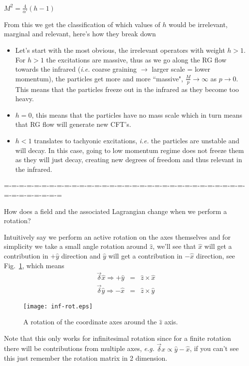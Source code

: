 \documentclass[aps,preprint,preprintnumbers,nofootinbib,showpacs,prd]{revtex4-1}
\newcommand{\ie}{{\it i.e.} }
\newcommand{\eg}{{\it e.g.} }
\newcommand{\bit}{\begin{itemize}}
\newcommand{\eit}{\end{itemize}}
\newcommand{\nbea}{\begin{eqnarray*}}
\newcommand{\neea}{\end{eqnarray*}}
\begin{document}
$M^2 = \frac{4}{\alpha'} (h - 1)$

From this we get the classification of which values of $h$ would be irrelevant, marginal and relevant, here's how they break down
\bit
\item Let's start with the most obvious, the irrelevant operators with weight $h > 1$. For $h > 1$ the excitations are massive, thus as we go along the RG flow towards the infrared (\ie coarse graining $\rightarrow$ larger scale = lower momentum), the particles get more and more ``massive", $\frac{M}{p} \rightarrow \infty$ as $p \rightarrow 0$. This means that the particles freeze out in the infrared as they become too heavy.
\item $h = 0$, this means that the particles have no mass scale which in turn means that RG flow will generate new CFT's.
\item $h < 1$ translates to tachyonic excitations, \ie the particles are unstable and will decay. In this case, going to low momentum regime does not freeze them as they will just decay, creating new degrees of freedom and thus relevant in the infrared.
\eit




=-=-=-=-=-=-=-=-=-=-=-=-=-=-=-=-=-=-=-=-=-=-=-=-=-=-=-=-=-=-=-=-=-=-=-=-=-=-=-=



How does a field and the associated Lagrangian change when we perform a rotation?

Intuitively say we perform an active rotation on the axes themselves and for simplicity we take a small angle rotation around $\hat z$, we'll see that $\hat x$ will get a contribution in $+\hat y$ direction and $\hat y$ will get a contribution in $-\hat x$ direction, see Fig.~\ref{fig:inf-rot}, which means
\nbea
\vec \delta \hat x \Rightarrow +\hat y & = & \hat z \times \hat x \\
\vec \delta \hat y \Rightarrow -\hat x & = & \hat z \times \hat y
\neea
%
\begin{figure}
\begin{center}
  \texttt{[image: inf-rot.eps]}
\end{center}
  \caption{\label{fig:inf-rot}
A rotation of the coordinate axes around the $\hat z$ axis.}
\end{figure}
%

Note that this only works for infinitesimal rotation since for a finite rotation there will be contributions from multiple axes, \eg $\vec \delta x \propto \hat y - \hat x$, if you can't see this just remember the rotation matrix in 2 dimension.
\end{document}
